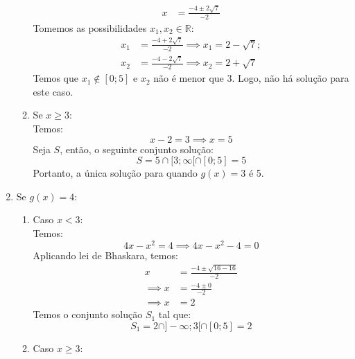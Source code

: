 \begin{enumerate}
\begin{enumerate}
\begin{align*}
                    x &= \frac{-4 \pm 2\sqrt{7}}{-2}
                \end{align*}
                Tomemos as possibilidades $x_1, x_2 \in \mathbb{R}$:
                \begin{align*}
                    x_1 &= \frac{-4 + 2\sqrt{7}}{-2} \implies x_1 = 2 - \sqrt{7} ; \\ 
                    x_2 &= \frac{-4 - 2\sqrt{7}}{-2} \implies x_2 = 2 + \sqrt{7}
                \end{align*}
                Temos que $x_1 \notin [0;5]$ e $x_2$ não é menor que 3. Logo, não há solução para este caso.
            \item Se $x \ge 3$: \\
                Temos:
                \begin{displaymath}
                    x - 2 = 3 \implies x = 5
                \end{displaymath}
                Seja $S$, então, o seguinte conjunto solução:
                \begin{displaymath}
                    S = 5 \cap [3; \infty[ \cap [0; 5] = 5
                \end{displaymath}
                Portanto, a única solução para quando $g(x) = 3$ é 5.
            \end{enumerate}
        \item Se $g(x) = 4$:
        \begin{enumerate}
            \item Caso $x < 3$: \\
                Temos:
                \begin{displaymath}
                    4x - x^2 = 4 \implies 4x - x^2 - 4 = 0
                \end{displaymath}
                Aplicando lei de Bhaskara, temos:
                \begin{align*}
                    x &= \frac{-4 \pm \sqrt{16 - 16}}{-2} \\ \implies
                    x &= \frac{-4 \pm 0}{-2} \\ \implies 
                    x &= 2
                \end{align*}
                Temos o conjunto solução $S_1$ tal que:
                \begin{displaymath}
                    S_1 = 2 \cap ]-\infty; 3[ \cap [0; 5] = 2
                \end{displaymath}
            \item Caso $x \ge 3$: \\

\end{enumerate}
\end{enumerate}
